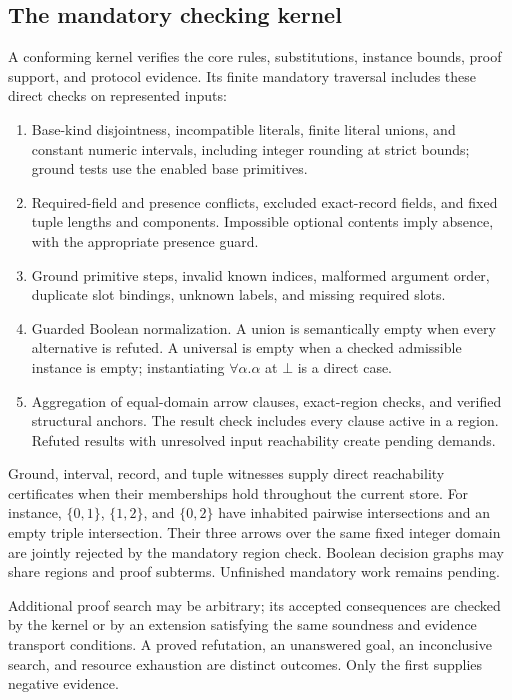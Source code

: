 \documentclass[10pt,a4paper]{article}
\theoremstyle{remark}
\begin{document}
\subsection{The mandatory checking kernel}
A conforming kernel verifies the core rules, substitutions, instance bounds,
proof support, and protocol evidence. Its finite mandatory traversal includes
these direct checks on represented inputs:
\begin{enumerate}
\item Base-kind disjointness, incompatible literals, finite literal unions,
and constant numeric intervals, including integer rounding at strict bounds;
ground tests use the enabled base primitives.
\item Required-field and presence conflicts, excluded exact-record fields,
and fixed tuple lengths and components. Impossible optional contents imply
absence, with the appropriate presence guard.
\item Ground primitive steps, invalid known indices, malformed argument order,
duplicate slot bindings, unknown labels, and missing required slots.
\item Guarded Boolean normalization. A union is semantically empty when every
alternative is refuted. A universal is empty when a checked admissible instance
is empty; instantiating $\forall\alpha.\alpha$ at $\bot$ is a direct case.
\item Aggregation of equal-domain arrow clauses, exact-region checks, and
verified structural anchors. The result check includes every clause active in
a region. Refuted results with unresolved input reachability create pending
demands.
\end{enumerate}
Ground, interval, record, and tuple witnesses supply direct reachability
certificates when their memberships hold throughout the current store.
For instance, $\{0,1\}$, $\{1,2\}$, and $\{0,2\}$ have inhabited pairwise
intersections and an empty triple intersection. Their three arrows over the
same fixed integer domain are jointly rejected by the mandatory region check.
Boolean decision graphs may share regions and proof subterms. Unfinished
mandatory work remains pending.

Additional proof search may be arbitrary; its accepted consequences are checked
by the kernel or by an extension satisfying the same soundness and evidence
transport conditions. A proved refutation, an unanswered goal, an inconclusive
search, and resource exhaustion are distinct outcomes. Only the first supplies
negative evidence.
\end{document}
